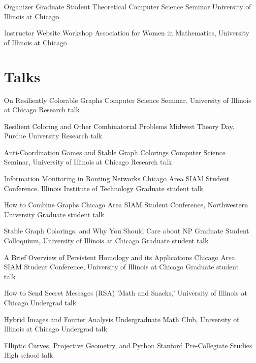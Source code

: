 \documentclass[11pt]{moderncv}
\begin{document}
         {Organizer}
      {Graduate Student Theoretical Computer Science Seminar}
      {University of Illinois at Chicago}
      {}
{}

         {Instructor}
      {Website Workshop}
      {Association for Women in Mathematics, University of Illinois at Chicago}
      {}
{}


   \section{Talks}
         {On Resiliently Colorable Graphs}
      {Computer Science Seminar, University of Illinois at Chicago}
      {Research talk}
      {}
{}

         {Resilient Coloring and Other Combinatorial Problems}
      {Midwest Theory Day. Purdue University}
      {Research talk}
      {}
{}

         {Anti-Coordination Games and Stable Graph Colorings}
      {Computer Science Seminar, University of Illinois at Chicago}
      {Research talk}
      {}
{}

         {Information Monitoring in Routing Networks}
      {Chicago Area SIAM Student Conference, Illinois Institute of Technology}
      {Graduate student talk}
      {}
{}

         {How to Combine Graphs}
      {Chicago Area SIAM Student Conference, Northwestern University}
      {Graduate student talk}
      {}
{}

         {Stable Graph Colorings, and Why You Should Care about NP}
      {Graduate Student Colloquium, University of Illinois at Chicago}
      {Graduate student talk}
      {}
{}

         {A Brief Overview of Persistent Homology and its Applications}
      {Chicago Area SIAM Student Conference, University of Illinois at Chicago}
      {Graduate student talk}
      {}
{}

         {How to Send Secret Messages (RSA)}
      {'Math and Snacks,' University of Illinois at Chicago}
      {Undergrad talk}
      {}
{}

         {Hybrid Images and Fourier Analysis}
      {Undergraduate Math Club, University of Illinois at Chicago}
      {Undergrad talk}
      {}
{}

         {Elliptic Curves, Projective Geometry, and Python}
      {Stanford Pre-Collegiate Studies}
      {High school talk}
      {}
{}
\end{document}
